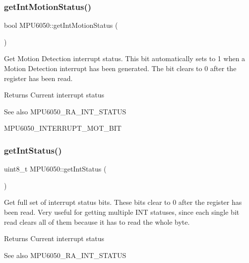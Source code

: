 \subsubsection{\texorpdfstring{getIntMotionStatus()}{getIntMotionStatus()}}
{\footnotesize\ttfamily bool M\+P\+U6050\+::get\+Int\+Motion\+Status (\begin{DoxyParamCaption}{ }\end{DoxyParamCaption})}

Get Motion Detection interrupt status. This bit automatically sets to 1 when a Motion Detection interrupt has been generated. The bit clears to 0 after the register has been read. \begin{DoxyReturn}{Returns}
Current interrupt status 
\end{DoxyReturn}
\begin{DoxySeeAlso}{See also}
M\+P\+U6050\+\_\+\+R\+A\+\_\+\+I\+N\+T\+\_\+\+S\+T\+A\+T\+US 

M\+P\+U6050\+\_\+\+I\+N\+T\+E\+R\+R\+U\+P\+T\+\_\+\+M\+O\+T\+\_\+\+B\+IT 
\end{DoxySeeAlso}
\mbox{\label{class_m_p_u6050_a550a735623cb1de950c72cd6931ee804}} 
\subsubsection{\texorpdfstring{getIntStatus()}{getIntStatus()}}
{\footnotesize\ttfamily uint8\+\_\+t M\+P\+U6050\+::get\+Int\+Status (\begin{DoxyParamCaption}{ }\end{DoxyParamCaption})}

Get full set of interrupt status bits. These bits clear to 0 after the register has been read. Very useful for getting multiple I\+NT statuses, since each single bit read clears all of them because it has to read the whole byte. \begin{DoxyReturn}{Returns}
Current interrupt status 
\end{DoxyReturn}
\begin{DoxySeeAlso}{See also}
M\+P\+U6050\+\_\+\+R\+A\+\_\+\+I\+N\+T\+\_\+\+S\+T\+A\+T\+US 
\end{DoxySeeAlso}
\mbox{\label{class_m_p_u6050_ab3cc9bcaca6cec61e7f3f0c6c8a37db5}} 
